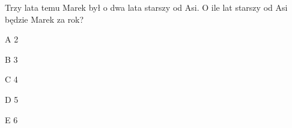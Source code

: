 \begin{tresc}
Trzy lata temu Marek był o dwa lata starszy od Asi. O ile lat starszy od Asi będzie Marek za rok?
\end{tresc}
\begin{wariant}{A} 2 \end{wariant}
\begin{wariant}{B} 3 \end{wariant}
\begin{wariant}{C} 4 \end{wariant}
\begin{wariant}{D} 5 \end{wariant}
\begin{wariant}{E} 6 \end{wariant}
